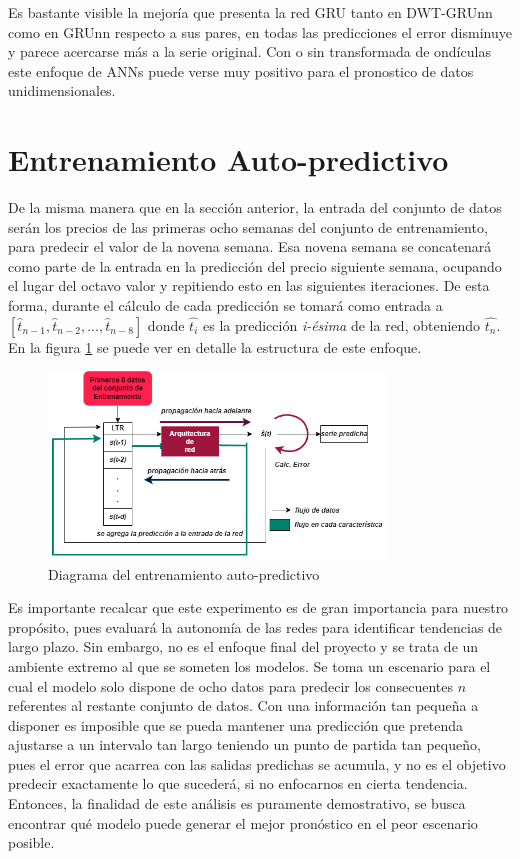 Es bastante visible la mejoría que presenta la red GRU tanto en DWT-GRUnn como en GRUnn respecto a sus pares, en todas las predicciones el error disminuye y parece acercarse más a la serie original. Con o sin transformada de ondículas este enfoque de ANNs puede verse muy positivo para el pronostico de datos unidimensionales.

\newpage

\section{Entrenamiento Auto-predictivo}

De la misma manera que en la sección anterior, la entrada del conjunto de datos serán los precios de las primeras ocho semanas del conjunto de entrenamiento, para predecir el valor de la novena semana. Esa novena semana se concatenará como parte de la entrada en la predicción del precio siguiente semana, ocupando el lugar del octavo valor y repitiendo esto en las siguientes iteraciones. De esta forma, durante el cálculo de cada predicción se tomará como entrada a $[\hat{t}_{n-1}, \hat{t}_{n-2}, ..., \hat{t}_{n-8}]$ donde $\hat{t_i}$ es la predicción \textit{i-ésima} de la red, obteniendo $\hat{t_n}$. En la figura \ref{fig:entrenamiento_auto_predictivo} se puede ver en detalle la estructura de este enfoque.

\begin{figure}[h]
    \centering
    \includegraphics[width=0.8\textwidth]{Figuras/proceso_de_entrenamiento/Entrenamiento_auto_predictivo.png}
    \caption{Diagrama del entrenamiento auto-predictivo} 
    \label{fig:entrenamiento_auto_predictivo}
\end{figure}

Es importante recalcar que este experimento es de gran importancia para nuestro propósito, pues evaluará la autonomía de las redes para identificar tendencias de largo plazo. Sin embargo, no es el enfoque final del proyecto y se trata de un ambiente extremo al que se someten los modelos. Se toma un escenario para el cual el modelo solo dispone de ocho datos para predecir los consecuentes $n$ referentes al restante conjunto de datos. Con una información tan pequeña a disponer es imposible que se pueda mantener una predicción que pretenda ajustarse a un intervalo tan largo teniendo un punto de partida tan pequeño, pues el error que acarrea con las salidas predichas se acumula, y no es el objetivo predecir exactamente lo que sucederá, si no enfocarnos en cierta tendencia. Entonces, la finalidad de este análisis es puramente demostrativo, se busca encontrar qué modelo puede generar el mejor pronóstico en el peor escenario posible. 


